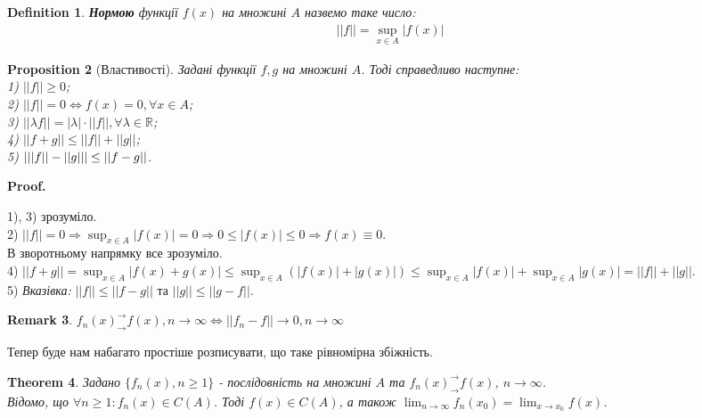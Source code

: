 \documentclass[a4paper, 10pt]{article}
\makeatletter
\def\huge{\displaystyle}
\def\qed{$\blacksquare$}
\theoremstyle{theoremdd}
\newtheorem{theorem}{Theorem}[subsection]
\theoremstyle{theoremdd}
\newtheorem{definition}[theorem]{Definition}
\theoremstyle{theoremdd}
\theoremstyle{theoremdd}
\theoremstyle{theoremdd}
\newtheorem{proposition}[theorem]{Proposition}
\theoremstyle{theoremdd}
\newtheorem{remark}[theorem]{Remark}
\theoremstyle{theoremdd}
\theoremstyle{theoremdd}
\renewenvironment{proof}[1][Proof.\\]{\par
\pushQED{\hfill \qed}%
\normalfont \topsep6\p@\@plus6\p@\relax
\trivlist
\item\relax
{\bfseries
#1\@addpunct{.}}\hspace\labelsep\ignorespaces
}{%
\popQED\endtrivlist\@endpefalse
}
\makeatother
\begin{document}
\begin{definition}
\textbf{Нормою} функції $f(x)$ на множині $A$ назвемо таке число:
\begin{align*}
||f|| = \sup_{x \in A} |f(x)|
\end{align*}
\end{definition}

\begin{proposition}[Властивості]
Задані функції $f,g$ на множині $A$. Тоді справедливо наступне:\\
1) $||f|| \geq 0$;\\
2) $||f|| = 0 \iff f(x) = 0, \forall x \in A$;\\
3) $||\lambda f|| = |\lambda| \cdot ||f||, \forall \lambda \in \mathbb{R}$;\\
4) $||f+g|| \leq ||f|| + ||g||$;\\
5) $\abs{||f||-||g||} \leq ||f-g||$.
\end{proposition}

\begin{proof}
1), 3) зрозуміло. \\
2) $||f|| = 0 \Rightarrow \huge \sup_{x \in A}|f(x)| = 0 \Rightarrow 0 \leq |f(x)| \leq 0 \Rightarrow f(x) \equiv 0$.\\
В зворотньому напрямку все зрозуміло.\\
4) $||f+g|| = \huge \sup_{x \in A}|f(x)+g(x)| \leq \sup_{x \in A}(|f(x)| + |g(x)|) \leq \sup_{x \in A}|f(x)| +\sup_{x \in A}|g(x)| = ||f|| + ||g||$.\\
5) \textit{Вказівка:} $||f|| \leq ||f-g||$ та $||g|| \leq ||g-f||$.
\end{proof}

\begin{remark}
$f_n(x)^\rightarrow_\rightarrow f(x), n \to \infty \iff ||f_n - f|| \to 0, n \to \infty$
\end{remark}
Тепер буде нам набагато простіше розписувати, що таке рівномірна збіжність.

\begin{theorem}
Задано $\{f_n(x), n \geq 1\}$ - послідовність на множині $A$ та $f_n(x)^\rightarrow_\rightarrow f(x)$, $n \to \infty$.\\
Відомо, що $\forall n \geq 1: f_n(x) \in C(A)$. Тоді $f(x) \in C(A)$, а також $\huge\lim_{n \to \infty} f_n(x_0) = \lim_{x \to x_0} f(x)$.
\end{theorem}
\end{document}
